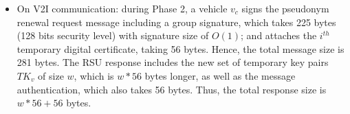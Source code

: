 \documentclass[preprint,12pt]{elsarticle}
\begin{document}
\begin{itemize}
\begin{itemize}
		\item On V2I communication: during Phase 2, a vehicle $v_{c}$ signs the pseudonym  renewal request message including a group signature, which takes 225 bytes (128 bits security level) with signature size of $O (1)$; and attaches the $i^{th}$ temporary digital certificate, taking 56 bytes. Hence, the total message size is 281 bytes. The RSU response includes the new set of temporary key pairs $TK_{v}$ of size $w$, which is $w*56$ bytes longer, as well as the message authentication, which also takes 56 bytes. Thus, the total response size is  $w*56 + 56$ bytes.
		
%		
		
	\end{itemize}
\end{itemize}
	
\end{document}
